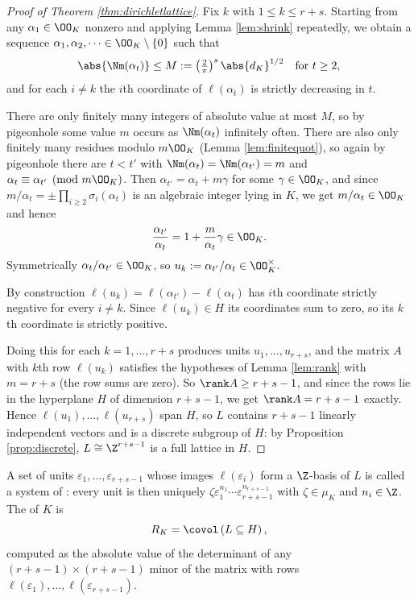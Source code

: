 \begin{proof}[Proof of Theorem \ref{thm:dirichletlattice}]
	Fix $k$ with $1 \le k \le r+s$. Starting from any $\alpha_1 \in \OO_K$ nonzero and applying Lemma \ref{lem:shrink} repeatedly, we obtain a sequence $\alpha_1,\alpha_2,\dots \in \OO_K\setminus\{0\}$ such that
	$$\abs{\Nm(\alpha_t)} \le M := \left(\tfrac2\pi\right)^{s}\abs{d_K}^{1/2}\quad\text{for } t \geq 2,$$
	and for each $i \neq k$ the $i$th coordinate of $\ell(\alpha_t)$ is strictly decreasing in $t$.

	There are only finitely many integers of absolute value at most $M$, so by pigeonhole some value $m$ occurs as $\Nm(\alpha_t)$ infinitely often. There are also only finitely many residues modulo $m\OO_K$ (Lemma \ref{lem:finitequot}), so again by pigeonhole there are $t < t'$ with $\Nm(\alpha_t) = \Nm(\alpha_{t'}) = m$ and $\alpha_t \equiv \alpha_{t'} \pmod{m\OO_K}$. Then $\alpha_{t'} = \alpha_t + m\gamma$ for some $\gamma \in \OO_K$, and since $m/\alpha_t = \pm\prod_{i\ge2}\sigma_i(\alpha_t)$ is an algebraic integer lying in $K$, we get $m/\alpha_t \in \OO_K$ and hence
	$$\frac{\alpha_{t'}}{\alpha_t} = 1 + \frac{m}{\alpha_t}\gamma \in \OO_K.$$
	Symmetrically $\alpha_t/\alpha_{t'} \in \OO_K$, so $u_k := \alpha_{t'}/\alpha_t \in \OO_K^\times$.

	By construction $\ell(u_k) = \ell(\alpha_{t'}) - \ell(\alpha_t)$ has $i$th coordinate strictly negative for every $i \neq k$. Since $\ell(u_k) \in H$ its coordinates sum to zero, so its $k$th coordinate is strictly positive.

	Doing this for each $k = 1,\dots,r+s$ produces units $u_1,\dots,u_{r+s}$, and the matrix $A$ with $k$th row $\ell(u_k)$ satisfies the hypotheses of Lemma \ref{lem:rank} with $m = r+s$ (the row sums are zero). So $\rank A \geq r+s-1$, and since the rows lie in the hyperplane $H$ of dimension $r+s-1$, we get $\rank A = r+s-1$ exactly. Hence $\ell(u_1),\dots,\ell(u_{r+s})$ span $H$, so $L$ contains $r+s-1$ linearly independent vectors and is a discrete subgroup of $H$: by Proposition \ref{prop:discrete}, $L \cong \Z^{r+s-1}$ is a full lattice in $H$.
\end{proof}

\begin{definition}
	A set of units $\varepsilon_1,\dots,\varepsilon_{r+s-1}$ whose images $\ell(\varepsilon_i)$ form a $\Z$-basis of $L$ is called a system of : every unit is then uniquely $\zeta\varepsilon_1^{n_1}\cdots\varepsilon_{r+s-1}^{n_{r+s-1}}$ with $\zeta \in \mu_K$ and $n_i\in\Z$. The  of $K$ is
	$$R_K = \covol\left(L \subseteq H\right),$$
	computed as the absolute value of the determinant of any $(r+s-1)\times(r+s-1)$ minor of the matrix with rows $\ell(\varepsilon_1),\dots,\ell(\varepsilon_{r+s-1})$.
\end{definition}

